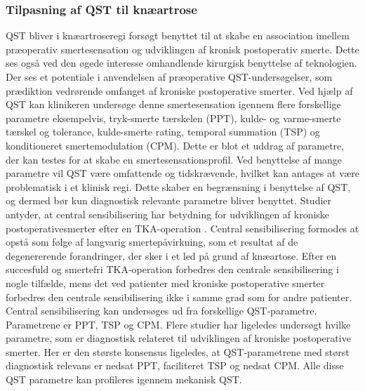 \subsubsection{Tilpasning af QST til knæartrose}
QST bliver i  knæartroseregi forsøgt benyttet til at skabe en association imellem præoperativ smertesensation og udviklingen af kronisk postoperativ smerte. Dette ses også ved den øgede interesse omhandlende kirurgisk benyttelse af teknologien. Der ses et potentiale i anvendelsen af præoperative QST-undersøgelser, som prædiktion vedrørende omfanget af kroniske postoperative smerter. \citep{Wylde2013} Ved hjælp af QST kan klinikeren undersøge denne smertesensation igennem flere forskellige parametre eksempelvis, tryk-smerte tærskelen (PPT), kulde- og varme-smerte tærskel og tolerance, kulde-smerte rating, temporal summation (TSP) og konditioneret smertemodulation (CPM). \citep{Cornelius2015} Dette er blot et uddrag af parametre, der kan testes for at skabe en smertesensationsprofil. Ved benyttelse af mange parametre vil QST være omfattende og tidskrævende, hvilket kan antages at være problematisk i et klinisk regi. Dette skaber en begrænsning i benyttelse af QST, og dermed bør kun diagnostisk relevante parametre bliver benyttet. \citep{Nielsen2009} Studier antyder, at central sensibilisering har betydning for udviklingen af kroniske postoperativesmerter efter en TKA-operation \citep{Suokas2012}. Central sensibilisering formodes at opstå som følge af langvarig smertepåvirkning, som et resultat af de degenererende forandringer, der sker i et led på grund af knæartose. \citep{Arendt-Nielsen2015b} Efter en succesfuld og smertefri TKA-operation forbedres den centrale sensibilisering i nogle tilfælde, mens det ved patienter med kroniske postoperative smerter forbedres den centrale sensibilisering ikke i samme grad som for andre patienter. \citep{Arendt-Nielsen2015b} Central sensibilisering kan undersøges ud fra forskellige QST-parametre. Parametrene er PPT, TSP og CPM. \citep{Arendt-Nielsen2015b} Flere studier har ligeledes undersøgt hvilke parametre, som er diagnostisk relateret til udviklingen af kroniske postoperative smerter. Her er den største konsensus ligeledes, at QST-parametrene med størst diagnostisk relevans er nedsat PPT, faciliteret TSP og nedsat CPM. Alle disse QST parametre kan profileres igennem mekanisk QST. \citep{Petersen2015} \citep{Petersen2016} \citep{Wylde2015b} \\
